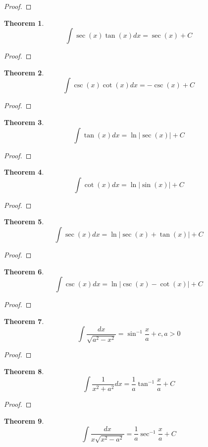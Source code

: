 \documentclass[10pt]{report}
\newtheorem{thm3}{Theorem}[subsection]
\begin{document}
\begin{proof}

\end{proof}
\begin{thm3}
$$\int \sec(x) \tan(x) dx= \sec(x) +C$$
\end{thm3}
\begin{proof}

\end{proof}
\begin{thm3}
$$\int \csc(x) \cot(x) dx= -\csc(x) + C$$
\end{thm3}
\begin{proof}

\end{proof}
\begin{thm3}
$$\int \tan(x) dx= \ln |\sec(x) |+C$$
\end{thm3}
\begin{proof}

\end{proof}
\begin{thm3}
$$\int \cot(x) dx= \ln |\sin(x)| + C$$
\end{thm3}
\begin{proof}

\end{proof}
\begin{thm3}
$$\int \sec(x) dx= \ln |\sec(x) +\tan(x)| + C$$
\end{thm3}
\begin{proof}

\end{proof}
\begin{thm3}
$$\int \csc(x) dx= \ln |\csc(x) - \cot(x)| + C$$
\end{thm3}
\begin{proof}

\end{proof}
\begin{thm3}
$$\int \frac{dx}{\sqrt{a^2 - x^2}}= \sin ^{-1}\frac{x}{a} + c, a>0$$
\end{thm3}
\begin{proof}

\end{proof}
\begin{thm3}
$$\int \frac{1}{x^2+a^2}dx=\frac{1}{a}\tan^{-1}\frac{x}{a}+C$$
\end{thm3}
\begin{proof}

\end{proof}
\begin{thm3}
$$\int \frac{dx}{x\sqrt{x^2 - a^2}}=\frac{1}{a}\sec^{-1}\frac{x}{a}+C$$
\end{thm3}
\end{document}
